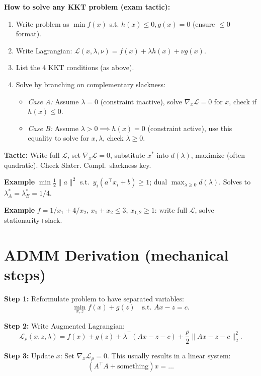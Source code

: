 \textbf{How to solve any KKT problem (exam tactic):}
\begin{enumerate}[leftmargin=*,itemsep=-1pt]
  \item Write problem as \(\min f(x)\) s.t. \(h(x) \leq 0, g(x) = 0\)
    (ensure \(\leq 0\) format).
  \item Write Lagrangian: \(\mathcal{L}(x, \lambda, \nu) = f(x) +
    \lambda h(x) + \nu g(x)\).
  \item List the 4 KKT conditions (as above).
  \item Solve by branching on complementary slackness:
    \begin{itemize}[leftmargin=*,itemsep=-1pt]
      \item \textit{Case A:} Assume \(\lambda = 0\) (constraint
        inactive), solve \(\nabla_x \mathcal{L}=0\) for \(x\), check
        if \(h(x)\leq 0\).
      \item \textit{Case B:} Assume \(\lambda > 0 \implies h(x)=0\)
        (constraint active), use this equality to solve for
        \(x,\lambda\), check \(\lambda \geq 0\).
    \end{itemize}
\end{enumerate}
\textbf{Tactic:} Write full \(\mathcal L\), set \(\nabla_x\mathcal
L=0\), substitute \(x^*\) into \(d(\lambda)\), maximize (often
quadratic). Check Slater. Compl.\ slackness key.

\textbf{Example} \(\min\frac12\|a\|^2\) s.t.\ \(y_i(a^\top
x_i+b)\ge1\); dual \(\max_{\lambda\ge0}d(\lambda)\). Solves to
\(\lambda_A^*=\lambda_B^*=1/4\).

\textbf{Example} \(f=1/x_1+4/x_2\), \(x_1+x_2\le3\),
\(x_{1,2}\ge1\): write full \(\mathcal L\), solve stationarity+slack.

\section*{ADMM Derivation (mechanical steps)}

\textbf{Step 1:} Reformulate problem to have separated variables:
\[
  \min_{x,z} f(x) + g(z) \quad \text{s.t. } Ax - z = c.
\]

\textbf{Step 2:} Write Augmented Lagrangian:
\[
  \mathcal{L}_\rho(x,z,\lambda) = f(x) + g(z) + \lambda^\top(Ax - z -
  c) + \frac{\rho}{2}\|Ax - z - c\|_2^2.
\]

\textbf{Step 3:} Update \(x\): Set \(\nabla_x \mathcal{L}_\rho = 0\).
This usually results in a linear system:
\[
  (A^\top A + \text{something})x = \dots
\]

